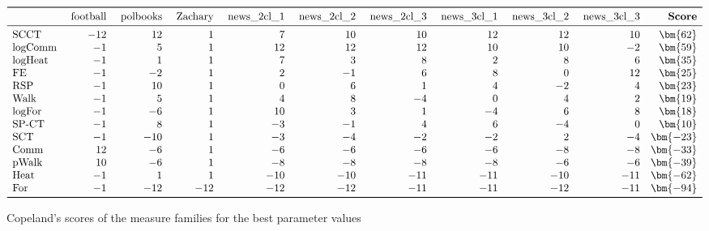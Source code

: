 \documentclass{article}
\begin{document}
\begin{table}[H] %
	\begin{minipage}{.99\textwidth}		
		\centering
		$$\begin{array}{lrrrrrrrrrr}
			\toprule		
            &\text{ football}&\text{ polbooks}&\text{ Zachary}&\text{ news\_2cl\_1}&\text{ news\_2cl\_2}&
            \text{ news\_2cl\_3}&\text{ news\_3cl\_1}&\text{ news\_3cl\_2}&\text{ news\_3cl\_3}&\textbf{ Score}\\
			\midrule
            \mbox{SCCT}    & -12&  12 &   1 &   7 &  10 &  10 &  12 &  12 &  10 & \bm{62}\\
            \mbox{logComm} & -1 &   5 &   1 &  12 &  12 &  12 &  10 &  10 &  -2 & \bm{59}\\
            \mbox{logHeat} & -1 &   1 &   1 &   7 &   3 &   8 &   2 &   8 &   6 & \bm{35}\\
            \mbox{FE}      & -1 &  -2 &   1 &   2 &  -1 &   6 &   8 &   0 &  12 & \bm{25}\\
            \mbox{RSP}     & -1 &  10 &   1 &   0 &   6 &   1 &   4 &  -2 &   4 & \bm{23}\\
            \mbox{Walk}    & -1 &   5 &   1 &   4 &   8 &  -4 &   0 &   4 &   2 & \bm{19}\\
            \mbox{logFor}  & -1 &  -6 &   1 &  10 &   3 &   1 &  -4 &   6 &   8 & \bm{18}\\
            \mbox{SP-CT}   & -1 &   8 &   1 &  -3 &  -1 &   4 &   6 &  -4 &   0 & \bm{10}\\
            \mbox{SCT}     & -1 & -10 &   1 &  -3 &  -4 &  -2 &  -2 &   2 &  -4 & \bm{-23}\\
            \mbox{Comm}    & 12 &  -6 &   1 &  -6 &  -6 &  -6 &  -6 &  -8 &  -8 & \bm{-33}\\
            \mbox{pWalk}   & 10 &  -6 &   1 &  -8 &  -8 &  -8 &  -8 &  -6 &  -6 & \bm{-39}\\
            \mbox{Heat}    & -1 &   1 &   1 & -10 & -10 & -11 & -11 & -10 & -11 & \bm{-62}\\
            \mbox{For}     & -1 & -12 & -12 & -12 & -12 & -11 & -11 & -12 & -11 & \bm{-94}\\
			\bottomrule
		\end{array}$$
	\end{minipage}
	\caption{\label{t_CopComp2}Copeland's scores of the measure families for the best parameter values}
\end{table}
\end{document}
